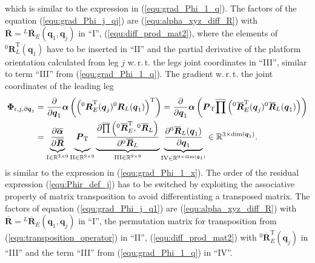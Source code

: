 \documentclass[robotics,article,submit,moreauthors,pdftex]{Definitions/mdpi}
\newcommand{\bm}[1]{\boldsymbol{#1}}
\newcommand{\rotmat}[2]{{{ }^{#1}\boldsymbol{R}}_{#2}}
\newcommand{\rotmato}[2]{{{ }^{#1}\boldsymbol{\overline{R}}}_{#2}}
\newcommand{\transp}[0]{{\mathrm{T}}}
\begin{document}
%
which is similar to the expression in (\ref{equ:grad_Phi_1_q}).
The factors of the equation (\ref{equ:grad_Phi_j_qj}) are
(\ref{equ:alpha_xyz_diff_R}) with $\overline{\bm{R}}=\rotmato{L}{E}(\bm{q}_1,\bm{q}_j)$ in ``I'',
(\ref{equ:diff_prod_mat2}), where the elements of $\rotmat{0}{L}^\transp(\bm{q}_1)$ have to be inserted in ``II'' and
the partial derivative of the platform orientation calculated from leg $j$ w.\,r.\,t. the legs joint coordinates in ``III'', similar to term ``III'' from (\ref{equ:grad_Phi_1_q}).
%
The gradient w.\,r.\,t. the joint coordinates of the leading leg
%
\begin{align}
\bm{\Phi}_{\mathrm{r},j,\partial\bm{q}_1}
&=
\frac{\partial}{\partial \bm{q}_1} \bm{\alpha}\left(\left(\rotmat{0}{E}^\transp(\bm{q}_j) \rotmat{0}{L}(\bm{q}_1) \right)^\transp \right)
=
\frac{\partial}{\partial \bm{q}_1} \bm{\alpha}\left(\bm{P}_{\mathrm{T}}\overline{\prod}\left( \rotmato{0}{E}^\transp(\bm{q}_j) \rotmato{0}{L}(\bm{q}_1)\right)\right)  \label{equ:grad_Phi_j_q1}\\
&=
\underbrace{\vphantom{\frac{\partial \overline{\prod}\left( \rotmato{0}{E}^\transp, \rotmato{0}{D}\right)}{\partial \rotmato{0}{D}}}
	\frac{\partial \overline{\bm{\alpha}}}{\partial \overline{\bm{R}}}}_{\mathrm{I} \in {\mathbb{R}}^{3 \times 9}}
\underbrace{\vphantom{\frac{\partial \overline{\prod}\left( \rotmato{0}{E}^\transp, \rotmato{0}{D}\right)}{\partial \rotmato{0}{D}}}
	\bm{P}_{\mathrm{T}}}_{\mathrm{II} \in {\mathbb{R}}^{9 \times 9}}
\underbrace{\frac{\partial \overline{\prod}\left( \rotmato{0}{E}^\transp, \rotmato{0}{L}\right)}{\partial \rotmato{0}{L}}}_{\mathrm{III} \in {\mathbb{R}}^{9 \times 9}}
\underbrace{\frac{\partial \rotmato{0}{L}(\bm{q}_1)}{\partial \bm{q}_1}}_{\mathrm{IV} \in {\mathbb{R}}^{9 \times \mathrm{dim}(\bm{q}_1)}}
\in {\mathbb{R}}^{3 \times \mathrm{dim}(\bm{q}_1)}. \nonumber
\end{align}
%
is similar to the expression in (\ref{equ:grad_Phi_1_x}).
The order of the residual expression (\ref{equ:Phir_def_j}) has to be switched by exploiting the associative property of matrix transposition to avoid differentiating a transposed matrix.
The factors of equation (\ref{equ:grad_Phi_j_q1}) are
(\ref{equ:alpha_xyz_diff_R}) with $\overline{\bm{R}}=\rotmato{L}{E}(\bm{q}_1,\bm{q}_j)$ in ``I'',
the permutation matrix for transposition from (\ref{equ:transposition_operator}) in ``II'',
(\ref{equ:diff_prod_mat2}) with $\rotmato{0}{E}^\transp(\bm{q}_j)$ in ``III'' and
the term ``III'' from (\ref{equ:grad_Phi_1_q}) in ``IV''.
\end{document}

